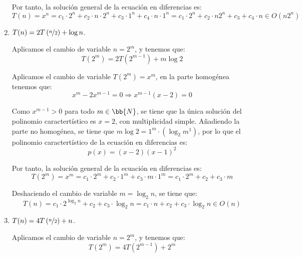 \begin{ejercicio}
\begin{enumerate}[label=\alph*)]
        Por tanto, la solución general de la ecuación en diferencias es:
        \begin{equation*}
            T(n) = x^n = c_1\cdot 2^n + c_2\cdot n\cdot 2^n + c_3\cdot 1^n + c_4\cdot n\cdot 1^n = c_1\cdot 2^n + c_2\cdot n2^n + c_3 + c_4\cdot n \in O(n 2^n)
        \end{equation*}

        \item $T(n)=2T\left(\nicefrac{n}{2}\right) + \log n$.
        
        Aplicamos el cambio de variable $n=2^m$, y tenemos que:
        \begin{equation*}
            T(2^m)=2T\left(2^{m-1}\right) + m\log 2
        \end{equation*}

        Aplicamos el cambio de variable $T(2^m)=x^m$, en la parte homogénea tenemos que:
        \begin{equation*}
            x^m - 2x^{m-1} = 0 \Longrightarrow x^{m-1}(x-2)=0
        \end{equation*}

        Como $x^{m-1}>0$ para todo $m\in \bb{N}$, se tiene que la única solución del polinomio caractertístico es $x=2$,
        con multiplicidad simple. Añadiendo la parte no homogénea, se tiene que $m\log 2 = 1^m \cdot (\log_2 m^1)$, por lo que el polinomio caractertístico
        de la ecuación en diferencias es:
        \begin{equation*}
            p(x) = (x-2)(x-1)^2
        \end{equation*}

        Por tanto, la solución general de la ecuación en diferencias es:
        \begin{equation*}
            T(2^m) = x^m = c_1\cdot 2^m + c_2\cdot 1^m + c_3\cdot m\cdot 1^m = c_1\cdot 2^m + c_2 + c_3\cdot m
        \end{equation*}

        Deshaciendo el cambio de variable $m=\log_2 n$, se tiene que:
        \begin{equation*}
            T(n) = c_1\cdot 2^{\log_2 n} + c_2 + c_3\cdot \log_2 n = c_1\cdot n + c_2 + c_3\cdot \log_2 n \in O(n)
        \end{equation*}
        \item $T(n)=4T\left(\nicefrac{n}{2}\right) + n$.
        
        Aplicamos el cambio de variable $n=2^m$, y tenemos que:
        \begin{equation*}
            T(2^m)=4T\left(2^{m-1}\right) + 2^m
        \end{equation*}


\end{enumerate}
\end{ejercicio}
